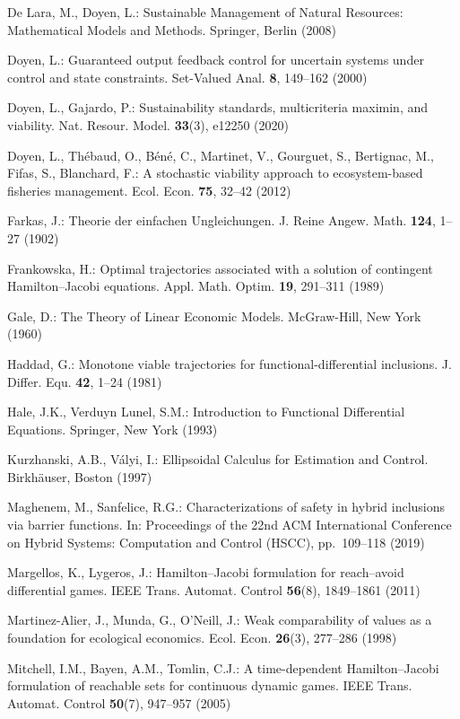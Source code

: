 \documentclass[10pt,twocolumn]{article}
\theoremstyle{definition}
\begin{document}
{De Lara, M., Doyen, L.: Sustainable Management of Natural Resources:
Mathematical Models and Methods. Springer, Berlin (2008)

Doyen, L.: Guaranteed output feedback control for uncertain systems under control and state constraints. Set-Valued Anal. \textbf{8}, 149--162 (2000)

Doyen, L., Gajardo, P.: Sustainability standards, multicriteria maximin,
and viability. Nat. Resour. Model. \textbf{33}(3), e12250 (2020)

Doyen, L., Th\'ebaud, O., B\'en\'e, C., Martinet, V., Gourguet, S., Bertignac,
M., Fifas, S., Blanchard, F.: A stochastic viability approach to
ecosystem-based fisheries management. Ecol. Econ. \textbf{75}, 32--42
(2012)

Farkas, J.: Theorie der einfachen Ungleichungen. J. Reine Angew. Math.
\textbf{124}, 1--27 (1902)

Frankowska, H.: Optimal trajectories associated with a solution of
contingent Hamilton--Jacobi equations. Appl. Math. Optim. \textbf{19},
291--311 (1989)

Gale, D.: The Theory of Linear Economic Models. McGraw-Hill, New York
(1960)

Haddad, G.: Monotone viable trajectories for functional-differential
inclusions. J. Differ. Equ. \textbf{42}, 1--24 (1981)

Hale, J.K., Verduyn Lunel, S.M.: Introduction to Functional Differential
Equations. Springer, New York (1993)

Kurzhanski, A.B., V\'alyi, I.: Ellipsoidal Calculus for Estimation and
Control. Birkh\"auser, Boston (1997)

Maghenem, M., Sanfelice, R.G.: Characterizations of safety in hybrid
inclusions via barrier functions. In: Proceedings of the 22nd ACM
International Conference on Hybrid Systems: Computation and Control
(HSCC), pp.~109--118 (2019)

Margellos, K., Lygeros, J.: Hamilton--Jacobi formulation for reach--avoid differential games. IEEE Trans. Automat. Control \textbf{56}(8), 1849--1861 (2011)

Martinez-Alier, J., Munda, G., O'Neill, J.: Weak comparability of values
as a foundation for ecological economics. Ecol. Econ. \textbf{26}(3),
277--286 (1998)

Mitchell, I.M., Bayen, A.M., Tomlin, C.J.: A time-dependent Hamilton--Jacobi formulation of reachable sets for continuous dynamic games. IEEE Trans. Automat. Control \textbf{50}(7), 947--957 (2005)

}
\end{document}
